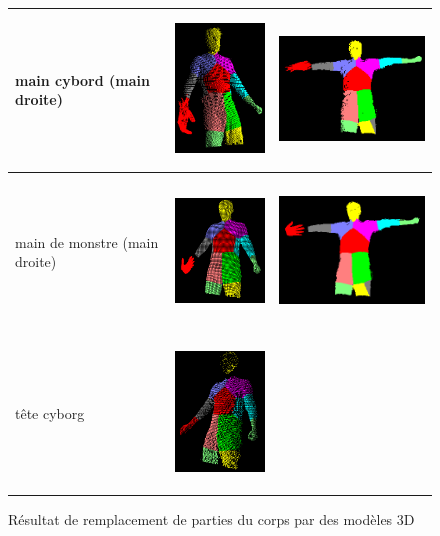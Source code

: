 \begin{figure}[!ht]
\begin{center}
\begin{tabular}{C{2cm}|c|c}
      main cybord (main droite) & \includegraphics[height=4cm]{image/cyborgHand1.PNG} & \includegraphics[height=4cm]{image/cyborgHand2.PNG} \\
      \hline
      main de monstre (main droite) & \includegraphics[height=4cm]{image/monsterHand1.PNG} & \includegraphics[height=4cm]{image/monsterHand2.PNG} \\
      \hline
      tête cyborg & \includegraphics[height=4cm]{image/cyborgHead.PNG} &  \\
      \hline
    \end{tabular}
    \caption{Résultat de remplacement de parties du corps par des modèles 3D}
    \label{tab:modelMatching}
  \end{center}
\end{figure}

